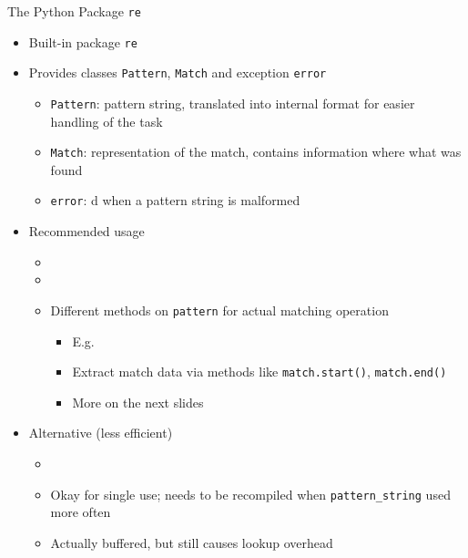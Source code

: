 \begin{frame}{The Python Package \texttt{re}}
%
\begin{itemize}
\item Built-in package \texttt{re}
\item Provides classes \texttt{Pattern}, \texttt{Match} and exception \texttt{error}
	\begin{itemize}
	\item \texttt{Pattern}: pattern string, translated into internal format for easier handling of the task
	\item \texttt{Match}: representation of the match, \ie contains information where what was found
	\item \texttt{error}: d when a pattern string is malformed
	\end{itemize}
\pause
\item Recommended usage
	\begin{itemize}
	\item {}
	\item {}
	\item Different methods on \texttt{pattern} for actual matching operation
		\begin{itemize}
		\item E.\;g. 
		\item Extract match data via methods like \texttt{match.start()}, \texttt{match.end()}
		\item More on the next slides
		\end{itemize}
	\end{itemize}
\pause
\item Alternative (less efficient)
	\begin{itemize}
	\item {}
	\item Okay for single use; needs to be recompiled when \texttt{pattern\_string} used more often
	\item Actually buffered, but still causes lookup overhead
	\end{itemize}
\end{itemize}
%
\end{frame}


